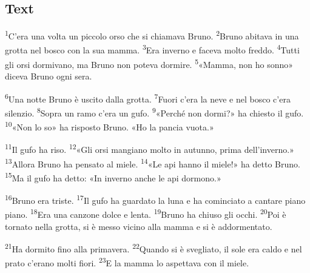 \documentclass[11pt,a4paper,twoside,openright]{book}
\newenvironment{storytext}{\par\begingroup\large\setlength{\parskip}{8pt}\linespread{1.15}\selectfont}{\par\endgroup}
\newcommand{\sentnum}[1]{\textsuperscript{\color{muted}\tiny #1}}
\begin{document}
\subsection*{Text}
\begin{storytext}
\sentnum{1}C'era una volta un piccolo orso che si chiamava Bruno. \sentnum{2}Bruno abitava in una grotta nel bosco con la sua mamma. \sentnum{3}Era inverno e faceva molto freddo. \sentnum{4}Tutti gli orsi dormivano, ma Bruno non poteva dormire. \sentnum{5}«Mamma, non ho sonno» diceva Bruno ogni sera.\par
\sentnum{6}Una notte Bruno è uscito dalla grotta. \sentnum{7}Fuori c'era la neve e nel bosco c'era silenzio. \sentnum{8}Sopra un ramo c'era un gufo. \sentnum{9}«Perché non dormi?» ha chiesto il gufo. \sentnum{10}«Non lo so» ha risposto Bruno. «Ho la pancia vuota.»\par
\sentnum{11}Il gufo ha riso. \sentnum{12}«Gli orsi mangiano molto in autunno, prima dell'inverno.» \sentnum{13}Allora Bruno ha pensato al miele. \sentnum{14}«Le api hanno il miele!» ha detto Bruno. \sentnum{15}Ma il gufo ha detto: «In inverno anche le api dormono.»\par
\sentnum{16}Bruno era triste. \sentnum{17}Il gufo ha guardato la luna e ha cominciato a cantare piano piano. \sentnum{18}Era una canzone dolce e lenta. \sentnum{19}Bruno ha chiuso gli occhi. \sentnum{20}Poi è tornato nella grotta, si è messo vicino alla mamma e si è addormentato.\par
\sentnum{21}Ha dormito fino alla primavera. \sentnum{22}Quando si è svegliato, il sole era caldo e nel prato c'erano molti fiori. \sentnum{23}E la mamma lo aspettava con il miele.\par
\end{storytext}
\end{document}
